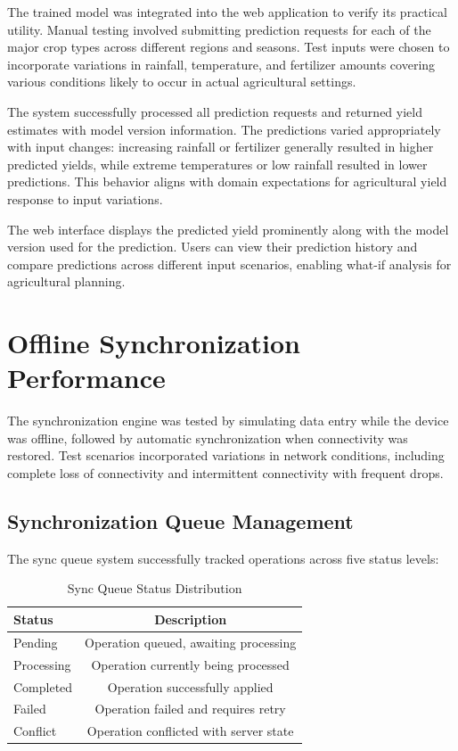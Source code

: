 The trained model was integrated into the web application to verify its practical utility. Manual testing involved submitting prediction requests for each of the major crop types across different regions and seasons. Test inputs were chosen to incorporate variations in rainfall, temperature, and fertilizer amounts covering various conditions likely to occur in actual agricultural settings.

The system successfully processed all prediction requests and returned yield estimates with model version information. The predictions varied appropriately with input changes: increasing rainfall or fertilizer generally resulted in higher predicted yields, while extreme temperatures or low rainfall resulted in lower predictions. This behavior aligns with domain expectations for agricultural yield response to input variations.

The web interface displays the predicted yield prominently along with the model version used for the prediction. Users can view their prediction history and compare predictions across different input scenarios, enabling what-if analysis for agricultural planning.

\section{Offline Synchronization Performance}

The synchronization engine was tested by simulating data entry while the device was offline, followed by automatic synchronization when connectivity was restored. Test scenarios incorporated variations in network conditions, including complete loss of connectivity and intermittent connectivity with frequent drops.

\subsection{Synchronization Queue Management}

The sync queue system successfully tracked operations across five status levels:

\begin{table}[H]
\centering
\caption{Sync Queue Status Distribution}
\label{tab:sync-status}
\begin{tabular}{lc}
\toprule
\textbf{Status} & \textbf{Description} \\
\midrule
Pending & Operation queued, awaiting processing \\
Processing & Operation currently being processed \\
Completed & Operation successfully applied \\
Failed & Operation failed and requires retry \\
Conflict & Operation conflicted with server state \\
\bottomrule
\end{tabular}
\end{table}


